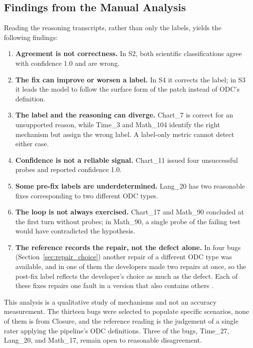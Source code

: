 \documentclass{iutbscthesis}
\begin{document}
\subsection{Findings from the Manual Analysis}

Reading the reasoning transcripts, rather than only the labels, yields the following findings:

\begin{enumerate}
    \item \textbf{Agreement is not correctness.} In S2, both scientific classifications agree with confidence 1.0 and are wrong.
    \item \textbf{The fix can improve or worsen a label.} In S4 it corrects the label; in S3 it leads the model to follow the surface form of the patch instead of ODC's definition.
    \item \textbf{The label and the reasoning can diverge.} Chart\_7 is correct for an unsupported reason, while Time\_3 and Math\_104 identify the right mechanism but assign the wrong label. A label-only metric cannot detect either case.
    \item \textbf{Confidence is not a reliable signal.} Chart\_11 issued four unsuccessful probes and reported confidence 1.0.
    \item \textbf{Some pre-fix labels are underdetermined.} Lang\_20 has two reasonable fixes corresponding to two different ODC types.
    \item \textbf{The loop is not always exercised.} Chart\_17 and Math\_90 concluded at the first turn without probes; in Math\_90, a single probe of the failing test would have contradicted the hypothesis.
    \item \textbf{The reference records the repair, not the defect alone.} In four bugs (Section~\ref{sec:repair_choice}) another repair of a different ODC type was available, and in one of them the developers made two repairs at once, so the post-fix label reflects the developer's choice as much as the defect. Each of these fixes repairs one fault in a version that also contains others \cite{callaghan2024mf}.
\end{enumerate}

This analysis is a qualitative study of mechanisms and not an accuracy measurement. The thirteen bugs were selected to populate specific scenarios, none of them is from Closure, and the reference reading is the judgement of a single rater applying the pipeline's ODC definitions. Three of the bugs, Time\_27, Lang\_20, and Math\_17, remain open to reasonable disagreement.
\end{document}
